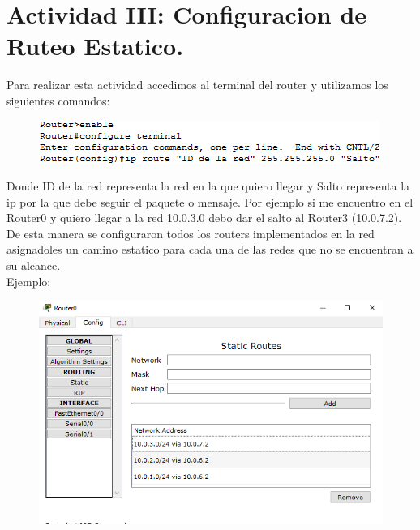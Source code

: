 \documentclass[spanish]{udpreport}
\begin{document}
\vspace{16cm}


\section{Actividad III: Configuracion de Ruteo Estatico.}

Para realizar esta actividad accedimos al terminal del router y utilizamos los siguientes comandos:\\

\begin{figure}[H]
\begin{center}
\includegraphics[scale=1]{images/comandos1.PNG}
\end{center}
\end{figure}

Donde ID de la red representa la red en la que quiero llegar y Salto representa la ip por la que debe seguir el paquete o mensaje. Por ejemplo si me encuentro en el Router0 y quiero llegar a la red 10.0.3.0 debo dar el salto al Router3 (10.0.7.2).\\

De esta manera se configuraron todos los routers implementados en la red asignadoles un camino estatico para cada una de las redes que no se encuentran a su alcance.\\

Ejemplo:
\begin{figure}[H]
\begin{center}
\includegraphics[scale=1]{images/static.PNG}
\end{center}
\end{figure}
\end{document}
